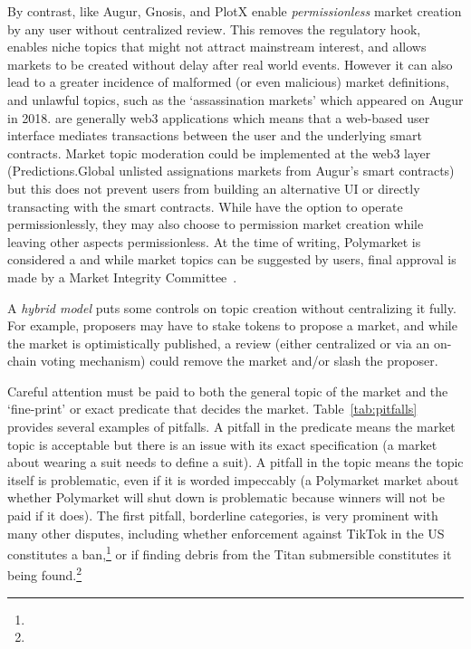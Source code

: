 By contrast, \depms like Augur, Gnosis, and PlotX enable \textit{permissionless} market creation by any user without centralized review. This removes the regulatory hook, enables niche topics that might not attract mainstream interest, and allows markets to be created without delay after real world events. However it can also lead to a greater incidence of malformed (or even malicious) market definitions, and unlawful topics, such as the `assassination markets' which appeared on Augur in 2018. \depms are generally web3 applications which means that a web-based user interface mediates transactions between the user and the underlying smart contracts. Market topic moderation could be implemented at the web3 layer (\eg Predictions.Global unlisted assignations markets from Augur's smart contracts) but this does not prevent users from building an alternative UI or directly transacting with the smart contracts. While \depms have the option to operate permissionlessly, they may also choose to permission market creation while leaving other aspects permissionless. At the time of writing, Polymarket is considered a \depm and while market topics can be suggested by users, final approval is made by a Market Integrity Committee~\cite{ClEsGS21}.

A \textit{hybrid model} puts some controls on topic creation without centralizing it fully. For example, proposers may have to stake tokens to propose a market, and while the market is optimistically published, a review (either centralized or via an on-chain voting mechanism) could remove the market and/or slash the proposer.  




Careful attention must be paid to both the general topic of the market and the `fine-print' or exact predicate that decides the market. Table~\ref{tab:pitfalls} provides several examples of pitfalls. A pitfall in the predicate means the market topic is acceptable but there is an issue with its exact specification (\eg a market about wearing a suit needs to define a suit). A pitfall in the topic means the topic itself is problematic, even if it is worded impeccably (\eg a Polymarket market about whether Polymarket will shut down is problematic because winners will not be paid if it does). The first pitfall, borderline categories, is very prominent with many other disputes, including whether enforcement against TikTok in the US constitutes a ban,\footnote{} or if finding debris from the Titan submersible constitutes it being found.\footnote{} 

